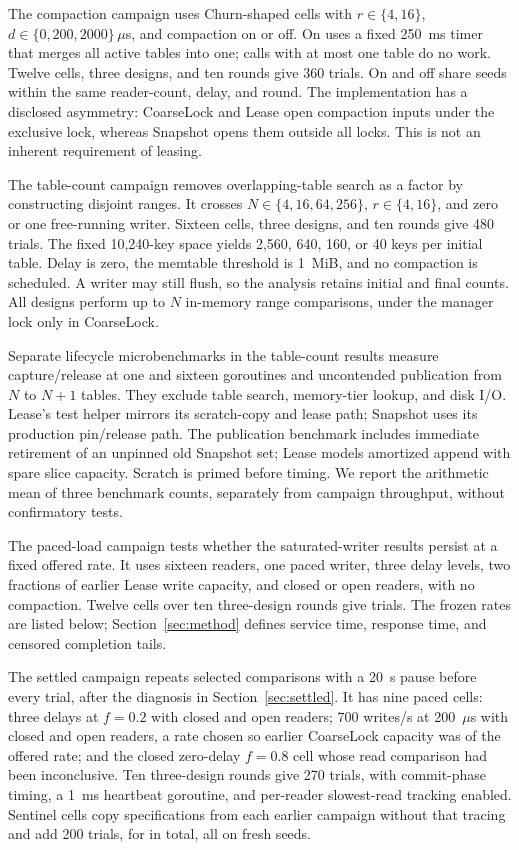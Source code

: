 The compaction campaign uses Churn-shaped cells with $r\in\{4,16\}$, $d\in\{0,200,2000\}\,\mu$s, and compaction on or off. On uses a fixed 250~ms timer that merges all active tables into one; calls with at most one table do no work. Twelve cells, three designs, and ten rounds give 360 trials. On and off share seeds within the same reader-count, delay, and round. The implementation has a disclosed asymmetry: CoarseLock and Lease open compaction inputs under the exclusive lock, whereas Snapshot opens them outside all locks. This is not an inherent requirement of leasing.

The table-count campaign removes overlapping-table search as a factor by constructing disjoint ranges. It crosses $N\in\{4,16,64,256\}$, $r\in\{4,16\}$, and zero or one free-running writer. Sixteen cells, three designs, and ten rounds give 480 trials. The fixed 10,240-key space yields 2,560, 640, 160, or 40 keys per initial table. Delay is zero, the memtable threshold is 1~MiB, and no compaction is scheduled. A writer may still flush, so the analysis retains initial and final counts. All designs perform up to $N$ in-memory range comparisons, under the manager lock only in CoarseLock.

Separate lifecycle microbenchmarks in the table-count results measure capture/release at one and sixteen goroutines and uncontended publication from $N$ to $N+1$ tables. They exclude table search, memory-tier lookup, and disk I/O. Lease's test helper mirrors its scratch-copy and lease path; Snapshot uses its production pin/release path. The publication benchmark includes immediate retirement of an unpinned old Snapshot set; Lease models amortized append with spare slice capacity. Scratch is primed before timing. We report the arithmetic mean of three benchmark counts, separately from campaign throughput, without confirmatory tests.

The paced-load campaign tests whether the saturated-writer results persist at a fixed offered rate. It uses sixteen readers, one paced writer, three delay levels, two fractions of earlier Lease write capacity, and closed or open readers, with no compaction. Twelve cells over ten three-design rounds give \PacedTrialCount{} trials. The frozen rates are listed below; Section~\ref{sec:method} defines service time, response time, and censored completion tails.

The settled campaign repeats selected comparisons with a 20~s pause before every trial, after the diagnosis in Section~\ref{sec:settled}. It has nine paced cells: three delays at $f=0.2$ with closed and open readers; 700 writes/s at 200~$\mu$s with closed and open readers, a rate chosen so earlier CoarseLock capacity was \SettledHWFraction{} of the offered rate; and the closed zero-delay $f=0.8$ cell whose read comparison had been inconclusive. Ten three-design rounds give 270 trials, with commit-phase timing, a 1~ms heartbeat goroutine, and per-reader slowest-read tracking enabled. Sentinel cells copy specifications from each earlier campaign without that tracing and add 200 trials, for \SettledTrialCount{} in total, all on fresh seeds.


